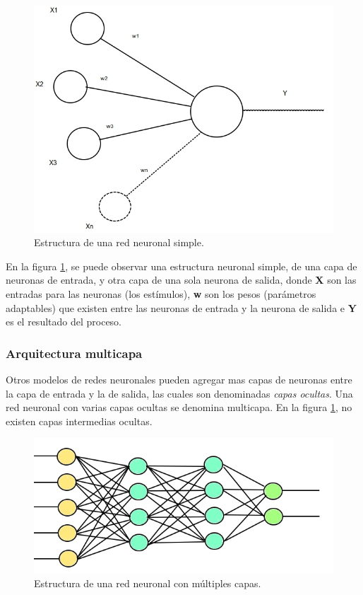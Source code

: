 \documentclass[a4paper,12pt,oneside,spanish]{book}
\begin{document}
\begin{figure}[h!]
	\includegraphics[width=340pt]{Imagenes/network1.jpg}
	\centering
	\caption{Estructura de una red neuronal simple.}
	\label{fig:network1}
\end{figure}

En la figura \ref{fig:network1}, se puede observar una estructura neuronal simple, de una capa de neuronas de entrada, y otra capa de una sola neurona de salida, donde \textbf{X} son las entradas para las neuronas (los estímulos), \textbf{w} son los pesos (parámetros adaptables) que existen entre las neuronas de entrada y la neurona de salida e \textbf{Y} es el resultado del proceso. \par

\subsubsection{Arquitectura multicapa}

Otros modelos de redes neuronales pueden agregar mas capas de neuronas entre la capa de entrada y la de salida, las cuales son denominadas \textit{capas ocultas}. Una red neuronal con varias capas ocultas se denomina multicapa. En la figura \ref{fig:network1}, no existen capas intermedias ocultas.

\begin{figure}[h!]
	\includegraphics[width=380pt]{Imagenes/network2.jpg}
	\centering
	\caption{Estructura de una red neuronal con múltiples capas.}
	\label{fig:network2}
\end{figure}
\end{document}

